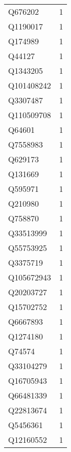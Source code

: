 \begin{tabular}{lr}
     Q676202 &                             1 \\
    Q1190017 &                             1 \\
     Q174989 &                             1 \\
      Q44127 &                             1 \\
    Q1343205 &                             1 \\
  Q101408242 &                             1 \\
    Q3307487 &                             1 \\
  Q110509708 &                             1 \\
      Q64601 &                             1 \\
    Q7558983 &                             1 \\
     Q629173 &                             1 \\
     Q131669 &                             1 \\
     Q595971 &                             1 \\
     Q210980 &                             1 \\
     Q758870 &                             1 \\
   Q33513999 &                             1 \\
   Q55753925 &                             1 \\
    Q3375719 &                             1 \\
  Q105672943 &                             1 \\
   Q20203727 &                             1 \\
   Q15702752 &                             1 \\
    Q6667893 &                             1 \\
    Q1274180 &                             1 \\
      Q74574 &                             1 \\
   Q33104279 &                             1 \\
   Q16705943 &                             1 \\
   Q66481339 &                             1 \\
   Q22813674 &                             1 \\
    Q5456361 &                             1 \\
   Q12160552 &                             1 \\

\end{tabular}
